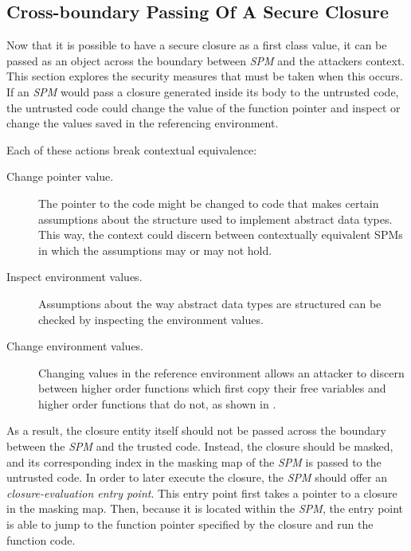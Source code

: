 \documentclass[10pt,a4paper,master=cws, masteroption=ai,english,inputenc=utf8]{kulemt}
\begin{document}
\subsection{Cross-boundary Passing Of A Secure Closure }
Now that it is possible to have a secure closure as a first class value, it can be passed as an object across the boundary between \emph{SPM} and the attackers context.
This section explores the security measures that must be taken when this occurs.
If an \emph{SPM} would pass a closure generated inside its body to the untrusted code, the untrusted code could change the value of the function pointer and inspect or change the values saved in the referencing environment.

Each of these actions break contextual equivalence:
\begin{description}
\item[Change pointer value.] The pointer to the code might be changed to code that makes certain assumptions about the structure used to implement abstract data types.
This way, the context could discern between contextually equivalent SPMs in which the assumptions may or may not hold. 
\item[Inspect environment values.]
Assumptions about the way abstract data types are structured can be checked by inspecting the environment values. 
\item[Change environment values.] Changing values in the reference environment allows an attacker to discern between higher order functions which first copy their free variables and higher order functions that do not, as shown in .
\end{description}

As a result, the closure entity itself should not be passed across the boundary between the \emph{SPM} and the trusted code.
Instead, the closure should be masked, and its corresponding index in the masking map of the \emph{SPM} is passed to the untrusted code.
In order to later execute the closure, the \emph{SPM} should offer an \emph{closure-evaluation entry point}.
This entry point first takes a pointer to a closure in the masking map.
Then, because it is located within the \emph{SPM}, the entry point is able to jump to the function pointer specified by the closure and run the function code.
\end{document}
